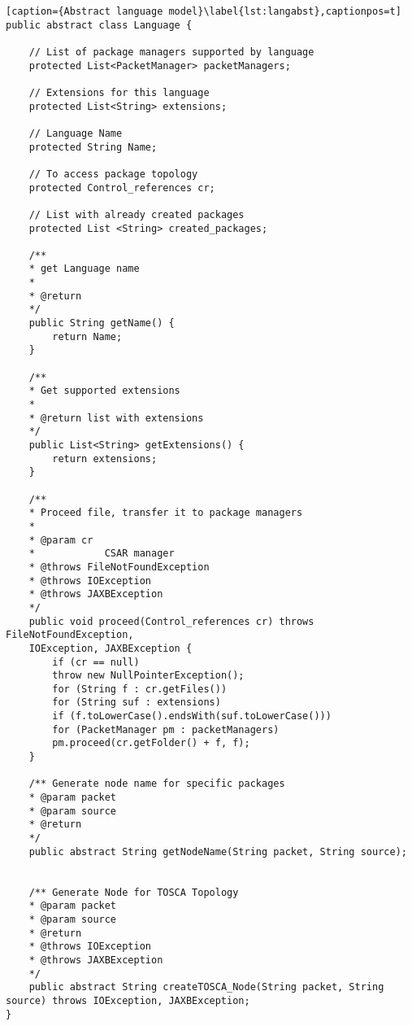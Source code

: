 \begin{lstlisting}[caption={Abstract language model}\label{lst:langabst},captionpos=t] 
public abstract class Language {
	
	// List of package managers supported by language
	protected List<PacketManager> packetManagers;
	
	// Extensions for this language
	protected List<String> extensions;
	
	// Language Name
	protected String Name;
	
	// To access package topology
	protected Control_references cr;
	
	// List with already created packages
	protected List <String> created_packages;
	
	/**
	* get Language name
	* 
	* @return
	*/
	public String getName() {
		return Name;
	}
	
	/**
	* Get supported extensions
	* 
	* @return list with extensions
	*/
	public List<String> getExtensions() {
		return extensions;
	}
	
	/**
	* Proceed file, transfer it to package managers
	* 
	* @param cr
	*            CSAR manager
	* @throws FileNotFoundException
	* @throws IOException
	* @throws JAXBException
	*/
	public void proceed(Control_references cr) throws FileNotFoundException,
	IOException, JAXBException {
		if (cr == null)
		throw new NullPointerException();
		for (String f : cr.getFiles())
		for (String suf : extensions)
		if (f.toLowerCase().endsWith(suf.toLowerCase()))
		for (PacketManager pm : packetManagers)
		pm.proceed(cr.getFolder() + f, f);
	}
	
	/**	Generate node name for specific packages
	* @param packet
	* @param source
	* @return
	*/
	public abstract String getNodeName(String packet, String source);
	
	
	/**	Generate Node for TOSCA Topology
	* @param packet
	* @param source
	* @return
	* @throws IOException
	* @throws JAXBException
	*/
	public abstract String createTOSCA_Node(String packet, String source) throws IOException, JAXBException;
}
\end{lstlisting}
